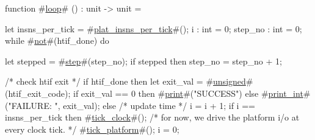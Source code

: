 function #\hyperref[sailRISCVzloop]{loop}# () : unit -> unit = {
  let insns_per_tick = #\hyperref[sailRISCVzplatzyinsnszyperzytick]{plat\_insns\_per\_tick}#();
  i : int = 0;
  step_no : int = 0;
  while #\hyperref[sailRISCVznot]{not}#(htif_done) do {
    let stepped = #\hyperref[sailRISCVzstep]{step}#(step_no);
    if stepped then step_no = step_no + 1;

    /* check htif exit */
    if htif_done then {
      let exit_val = #\hyperref[sailRISCVzunsigned]{unsigned}#(htif_exit_code);
      if exit_val == 0 then #\hyperref[sailRISCVzprint]{print}#("SUCCESS")
      else #\hyperref[sailRISCVzprintzyint]{print\_int}#("FAILURE: ", exit_val);
    } else {
      /* update time */
      i = i + 1;
      if i == insns_per_tick then {
        #\hyperref[sailRISCVztickzyclock]{tick\_clock}#();
        /* for now, we drive the platform i/o at every clock tick. */
        #\hyperref[sailRISCVztickzyplatform]{tick\_platform}#();
        i = 0;
      }
    }
  }
}
